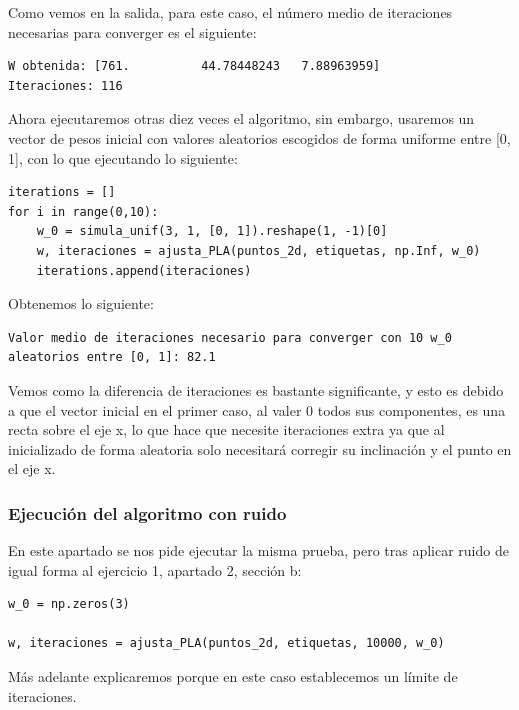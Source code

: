 \documentclass[12pt, spanish]{article}
\begin{document}
Como vemos en la salida, para este caso, el número medio de iteraciones necesarias para converger es el siguiente:

\begin{lstlisting}
W obtenida: [761.          44.78448243   7.88963959]
Iteraciones: 116
\end{lstlisting}

Ahora ejecutaremos otras diez veces el algoritmo, sin embargo, usaremos un vector de pesos inicial con valores aleatorios escogidos de forma uniforme entre [0, 1], con lo que ejecutando lo siguiente:

\begin{lstlisting}
iterations = []
for i in range(0,10):
	w_0 = simula_unif(3, 1, [0, 1]).reshape(1, -1)[0]
	w, iteraciones = ajusta_PLA(puntos_2d, etiquetas, np.Inf, w_0)
	iterations.append(iteraciones)
\end{lstlisting}

Obtenemos lo siguiente:

\begin{lstlisting}
Valor medio de iteraciones necesario para converger con 10 w_0 aleatorios entre [0, 1]: 82.1
\end{lstlisting}


Vemos como la diferencia de iteraciones es bastante significante, y esto es debido a que el vector inicial en el primer caso, al valer 0 todos sus componentes, es una recta sobre el eje x, lo que hace que necesite iteraciones extra ya que al inicializado de forma aleatoria solo necesitará corregir su inclinación y el punto en el eje x.


\subsubsection{Ejecución del algoritmo con ruido}

En este apartado se nos pide ejecutar la misma prueba, pero tras aplicar ruido de igual forma al ejercicio 1, apartado 2, sección b:

\begin{lstlisting}
w_0 = np.zeros(3)

w, iteraciones = ajusta_PLA(puntos_2d, etiquetas, 10000, w_0)
\end{lstlisting}

Más adelante explicaremos porque en este caso establecemos un límite de iteraciones.
\end{document}
